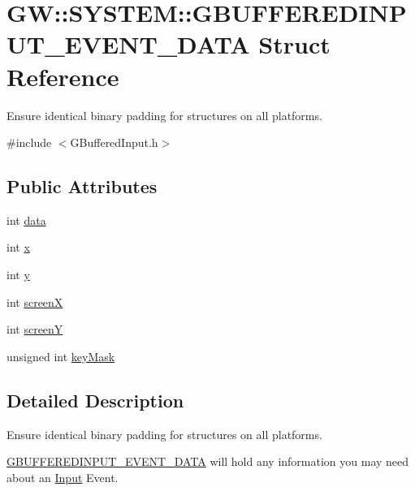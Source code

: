 \hypertarget{structGW_1_1SYSTEM_1_1GBUFFEREDINPUT__EVENT__DATA}{}\section{GW\+:\+:S\+Y\+S\+T\+EM\+:\+:G\+B\+U\+F\+F\+E\+R\+E\+D\+I\+N\+P\+U\+T\+\_\+\+E\+V\+E\+N\+T\+\_\+\+D\+A\+TA Struct Reference}
\label{structGW_1_1SYSTEM_1_1GBUFFEREDINPUT__EVENT__DATA}


Ensure identical binary padding for structures on all platforms.  




{\ttfamily \#include $<$G\+Buffered\+Input.\+h$>$}

\subsection*{Public Attributes}
\begin{DoxyCompactItemize}
\item 
int \hyperlink{structGW_1_1SYSTEM_1_1GBUFFEREDINPUT__EVENT__DATA_abe62d14dd92dc136e8ab4f53ee26d794}{data}
\item 
int \hyperlink{structGW_1_1SYSTEM_1_1GBUFFEREDINPUT__EVENT__DATA_a055e18b0d2aa3135ca8237bb06a0b4cb}{x}
\item 
int \hyperlink{structGW_1_1SYSTEM_1_1GBUFFEREDINPUT__EVENT__DATA_a68facd2e2754c908ecf8b8ef4ce34e08}{y}
\item 
int \hyperlink{structGW_1_1SYSTEM_1_1GBUFFEREDINPUT__EVENT__DATA_a8c87335f76992eddba30abe7312b5b43}{screenX}
\item 
int \hyperlink{structGW_1_1SYSTEM_1_1GBUFFEREDINPUT__EVENT__DATA_a066fa9b2dc654907d13590612238354d}{screenY}
\item 
unsigned int \hyperlink{structGW_1_1SYSTEM_1_1GBUFFEREDINPUT__EVENT__DATA_a7a818ba319e6693b89099938368a699e}{key\+Mask}
\end{DoxyCompactItemize}


\subsection{Detailed Description}
Ensure identical binary padding for structures on all platforms. 

\hyperlink{structGW_1_1SYSTEM_1_1GBUFFEREDINPUT__EVENT__DATA}{G\+B\+U\+F\+F\+E\+R\+E\+D\+I\+N\+P\+U\+T\+\_\+\+E\+V\+E\+N\+T\+\_\+\+D\+A\+TA} will hold any information you may need about an \hyperlink{classInput}{Input} Event. 

